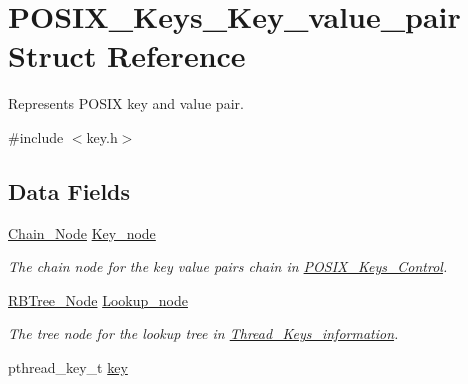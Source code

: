 \hypertarget{structPOSIX__Keys__Key__value__pair}{}\section{P\+O\+S\+I\+X\+\_\+\+Keys\+\_\+\+Key\+\_\+value\+\_\+pair Struct Reference}
\label{structPOSIX__Keys__Key__value__pair}


Represents P\+O\+S\+IX key and value pair.  




{\ttfamily \#include $<$key.\+h$>$}

\subsection*{Data Fields}
\begin{DoxyCompactItemize}
\item 
\mbox{\label{structPOSIX__Keys__Key__value__pair_a8e77d98d2ad53dd3242426850f5bfb2a}} 
\mbox{\hyperlink{group__RTEMSScoreChain_ga0dd4bfcca1ac7f90de2842e447846d3d}{Chain\+\_\+\+Node}} \mbox{\hyperlink{structPOSIX__Keys__Key__value__pair_a8e77d98d2ad53dd3242426850f5bfb2a}{Key\+\_\+node}}
\begin{DoxyCompactList}\small\item\em The chain node for the key value pairs chain in \mbox{\hyperlink{structPOSIX__Keys__Control}{P\+O\+S\+I\+X\+\_\+\+Keys\+\_\+\+Control}}. \end{DoxyCompactList}\item 
\mbox{\label{structPOSIX__Keys__Key__value__pair_a9cee89ec0a91444a9be0a6006b02a6b7}} 
\mbox{\hyperlink{structRBTree__Node}{R\+B\+Tree\+\_\+\+Node}} \mbox{\hyperlink{structPOSIX__Keys__Key__value__pair_a9cee89ec0a91444a9be0a6006b02a6b7}{Lookup\+\_\+node}}
\begin{DoxyCompactList}\small\item\em The tree node for the lookup tree in \mbox{\hyperlink{structThread__Keys__information}{Thread\+\_\+\+Keys\+\_\+information}}. \end{DoxyCompactList}\item 
\mbox{\label{structPOSIX__Keys__Key__value__pair_a429376147d46bc306d41f2dba1df2e77}} 
pthread\+\_\+key\+\_\+t \mbox{\hyperlink{structPOSIX__Keys__Key__value__pair_a429376147d46bc306d41f2dba1df2e77}{key}}

\end{DoxyCompactItemize}
